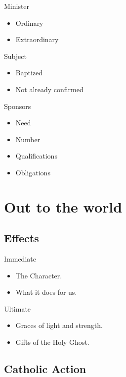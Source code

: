 \documentclass{beamer}
\begin{document}
\begin{frame}{Minister}
\begin{itemize}
\item Ordinary
\item Extraordinary
\end{itemize}
\end{frame}

\begin{frame}{Subject}
\begin{itemize}
\item Baptized
\item Not already confirmed
\end{itemize}
\end{frame}

\begin{frame}{Sponsors}
\begin{itemize}
\item Need
\item Number
\item Qualifications
\item Obligations
\end{itemize}
\end{frame}

\section{Out to the world}

\subsection{Effects}

\begin{frame}{Immediate}
\begin{itemize}
\item The Character.
\item What it does for us.
\end{itemize}
\end{frame}

\begin{frame}{Ultimate}
\begin{itemize}
\item Graces of light and strength.
\item Gifts of the Holy Ghost.
\end{itemize}
\end{frame}

\subsection{Catholic Action}
\end{document}
